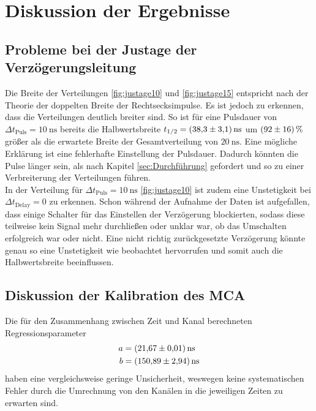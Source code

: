 \section{Diskussion der Ergebnisse}
\label{sec:Diskussion}

\subsection{Probleme bei der Justage der Verzögerungsleitung}
Die Breite der Verteilungen \ref{fig:justage10} und \ref{fig:justage15} entspricht 
nach der Theorie der doppelten Breite der Rechtsecksimpulse.
Es ist jedoch zu erkennen, dass die Verteilungen deutlich breiter sind. So ist für eine Pulsdauer
von $\Delta t_\text{Puls}=\SI{10}{\nano\second}$ bereits die Halbwertsbreite 
$t_{1/2}=\SI{38.3\pm 3.1}{\nano\second}$ um $\SI{92\pm 16}{\percent}$
größer als die erwartete Breite der Gesamtverteilung von $\SI{20}{\nano\second}$.
Eine mögliche Erklärung ist eine fehlerhafte Einstellung der Pulsdauer. Dadurch könnten
die Pulse länger sein, als nach Kapitel \ref{sec:Durchführung} gefordert und so zu einer 
Verbreiterung der Verteilungen führen.
\\
In der Verteilung für $\Delta t_{\text{Puls}}=\SI{10}{\nano\second}$ \ref{fig:justage10} ist zudem eine 
Unstetigkeit bei $\Delta t_\text{Delay}=0$ zu erkennen. Schon während der Aufnahme der Daten ist aufgefallen, 
dass einige Schalter für das Einstellen der Verzögerung blockierten, sodass diese teilweise kein Signal mehr
durchließen oder unklar war, ob das Umschalten erfolgreich war oder nicht. Eine nicht richtig zurückgesetzte 
Verzögerung könnte genau so eine Unstetigkeit wie beobachtet hervorrufen und somit auch die Halbwertsbreite
beeinflussen.

\subsection{Diskussion der Kalibration des MCA}
Die für den Zusammenhang zwischen Zeit und Kanal berechneten Regressionsparameter 
\begin{align*}
    a &= \SI{21.67 \pm 0.01}{\nano\second} \\ 
    b &= \SI{150.89 \pm 2.94}{\nano\second}
 \end{align*}
haben eine vergleichsweise geringe Unsicherheit, weswegen keine systematischen Fehler durch die Umrechnung von den Kanälen in die jeweiligen Zeiten zu erwarten sind. 

